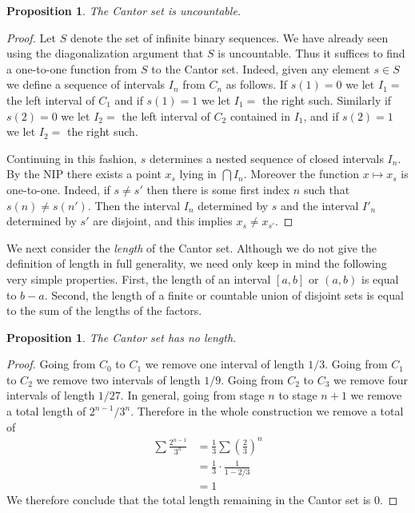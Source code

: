 \documentclass[11pt,oneside]{amsbook}
\theoremstyle{definition}
\theoremstyle{plain}
\newtheorem{prop}[thm]{Proposition}
\theoremstyle{definition}
\theoremstyle{remark}
\numberwithin{equation}{section}
\numberwithin{figure}{section}
\begin{document}
\begin{prop}
  The Cantor set is uncountable.
\end{prop}

\begin{proof}
  Let $S$ denote the set of infinite binary sequences. We have already seen using the diagonalization argument that $S$ is uncountable. Thus it suffices to find a one-to-one function from $S$ to the Cantor set. Indeed, given any element $s\in S$ we define a sequence of intervals $I_n$ from $C_n$ as follows. If $s(1)=0$ we let $I_1=$ the left interval of $C_1$ and if $s(1)=1$ we let $I_1=$ the right such. Similarly if $s(2)=0$ we let $I_2=$ the left interval of $C_2$ contained in $I_1$, and if $s(2)=1$ we let $I_2=$ the right such.

  Continuing in this fashion, $s$ determines a nested sequence of closed intervals $I_n$. By the NIP there exists a point $x_s$ lying in $\bigcap I_n$. Moreover the function $x\mapsto x_s$ is one-to-one. Indeed, if $s\neq s'$ then there is some first index $n$ such that $s(n)\neq s(n')$. Then the interval $I_n$ determined by $s$ and the interval $I'_n$ determined by $s'$ are disjoint, and this implies $x_s\neq x_{s'}$.
\end{proof}

We next consider the \emph{length} of the Cantor set. Although we do not give the definition of length in full generality, we need only keep in mind the following very simple properties. First, the length of an interval $[a,b]$ or $(a,b)$ is equal to $b-a$. Second, the length of a finite or countable union of disjoint sets is equal to the sum of the lengths of the factors.

\begin{prop}
  The Cantor set has no length.
\end{prop}

\begin{proof}
  Going from $C_0$ to $C_1$ we remove one interval of length $1/3$. Going from $C_1$ to $C_2$ we remove two intervals of length $1/9$. Going from $C_2$ to $C_3$ we remove four intervals of length $1/27$. In general, going from stage $n$ to stage $n+1$ we remove a total length of $2^{n-1}/3^n$. Therefore in the whole construction we remove a total of
  \begin{align*}
    \sum\frac{2^{n-1}}{3^n}&=\frac13\sum\left(\frac23\right)^n\\
                           &=\frac13\cdot\frac{1}{1-2/3}\\
                           &=1
  \end{align*}
  We therefore conclude that the total length remaining in the Cantor set is $0$.
\end{proof}
\end{document}
